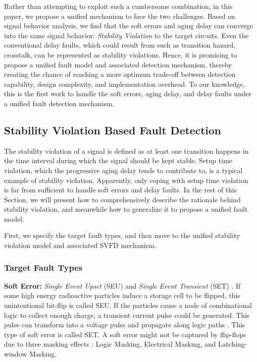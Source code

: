 Rather than attempting to exploit such a cumbersome combination, in this paper, we propose a unified mechanism to face the two challenges. Based on signal behavior analysis, we find that the soft errors and aging delay can converge into the same signal behavior: \emph{Stability Violation} to the target circuits. Even the conventional delay faults, which could result from such as transition hazard, crosstalk, can be represented as stability violations. Hence, it is promising to propose a unified fault model and associated detection mechanism, thereby creating the chance of reaching a more optimum trade-off between detection capability, design complexity, and implementation overhead. To our knowledge, this is the first work to handle the soft errors, aging delay, and delay faults under a unified fault detection mechanism.

\subsection{Stability Violation Based Fault Detection}
The stability violation of a signal is defined as at least one transition happens in the time interval during which the signal should be kept stable. Setup time violation, which the progressive aging delay tends to contribute to, is a typical example of stability violation. Apparently, only coping with setup time violation is far from sufficient to handle soft errors and delay faults. In the rest of this Section, we will present how to comprehensively describe the rationale behind stability violation, and meanwhile how to generalize it to propose a unified fault model.

First, we specify the target fault types, and then move to the unified stability violation model and associated SVFD mechanism.

\subsubsection{Target Fault Types}
{\bf Soft Error:} \emph{Single Event Upset} (SEU) and \emph{Single Event Transient} (SET) \cite{Nicolaidis_TDMR05}. If some high energy radioactive particles induce a storage cell to be flipped, this unintentional bit-flip is called SEU. If the particles cause a node of combinational logic to collect enough charge, a transient current pulse could be generated. This pulse can transform into a voltage pulse and propagate along logic paths  \cite{Shivakumar_DSN02}. This type of soft error is called SET. A soft error might not be captured by flip-flops due to three masking effects \cite{Shivakumar_DSN02}: Logic Masking, Electrical Masking, and Latching-window Masking.

